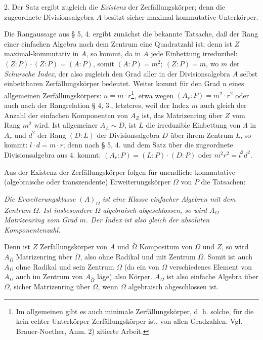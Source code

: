 2. Der Satz ergibt zugleich die \emph{Existenz} der Zerfällungskörper; denn die zugeordnete Divisionsalgebra \(A\) besitzt sicher maximal-kommutative Unterkörper.

\medskip
\noindent\textbf{}\quad Die Rangaussage aus § 5, 4. ergibt zunächst die bekannte Tatsache, daß der Rang einer einfachen Algebra nach dem Zentrum eine Quadratzahl ist; denn ist \(Z\) maximal-kommutativ in \(A\), so kommt, da in \(A\) jede Einbettung irreduzibel: \((Z:P)\cdot(Z:P)=(A:P)\), somit \((A:P)=m^2;\ (Z:P)=m\), wo \(m\) der \emph{Schursche Index}, der also zugleich den Grad aller in der Divisionsalgebra \(A\) selbst einbettbaren Zerfällungskörper bedeutet. Weiter kommt für den Grad \(n\) eines allgemeinen Zerfällungskörpers: \(n=m\cdot r\)\footnote{Im allgemeinen gibt es auch \glqq{}minimale\grqq{} Zerfällungskörper, d. h. solche, für die kein echter Unterkörper Zerfällungskörper ist, von allen Gradzahlen. Vgl. Brauer-Noether, Anm. 2) zitierte Arbeit.}, etwa wegen \((A_r:P)=m^2\cdot r^2\) oder auch nach der Rangrelation § 4, 3., letzteres, weil der Index \(m\) auch gleich der Anzahl der einfachen Komponenten von \(A_Z\) ist, das Matrizenring über \(Z\) vom Rang \(m^2\) wird. Ist allgemeiner \(A_\Lambda\sim D\), ist \(L\) die irreduzible Einbettung von \(\Lambda\) in \(A_r\) und \(d^2\) der Rang \((D:L)\) der Divisionsalgebra \(D\) über ihrem Zentrum \(L\), so kommt: \(l\cdot d=m\cdot r\); denn nach § 5, 4. und dem Satz über die zugeordnete Divisionsalgebra aus 4. kommt: \((A_r:P)=(L:P)\cdot(D:P)\) oder \(m^2r^2=l^2d^2\).

Aus der Existenz der Zerfällungskörper folgen für unendliche kommutative (algebraische oder transzendente) Erweiterungskörper \(\Omega\) von \(P\) die Tatsachen:

\noindent\emph{Die Erweiterungsklasse \((A)_\Omega\) ist eine Klasse einfacher Algebren mit dem Zentrum \(\Omega\). Ist insbesondere \(\Omega\) algebraisch-abgeschlossen, so wird \(A_\Omega\) Matrizenring vom Grad \(m\). Der Index ist also gleich der \glqq{}absoluten Komponentenzahl\grqq{}.}

Denn ist \(Z\) Zerfällungskörper von \(A\) und \(\bar\Omega\) Kompositum von \(\Omega\) und \(Z\), so wird \(A_{\bar\Omega}\) Matrizenring über \(\bar\Omega\), also ohne Radikal und mit Zentrum \(\bar\Omega\). Somit ist auch \(A_\Omega\) ohne Radikal und sein Zentrum \(\Omega\) (da ein von \(\Omega\) verschiedenes Element von \(A_\Omega\) auch im Zentrum von \(A_{\bar\Omega}\) läge) also Körper. \(A_\Omega\) ist also einfache Algebra über \(\Omega\), sicher Matrizenring über \(\Omega\), wenn \(\Omega\) algebraisch abgeschlossen ist.

